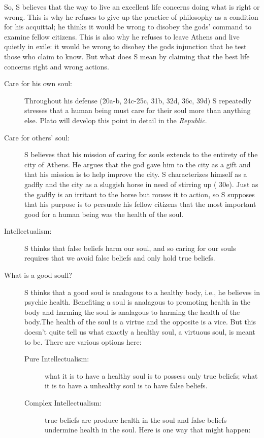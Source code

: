 \documentclass[oneside]{article}
\begin{document}
So, S believes that the way to live an excellent life concerns doing what is right or wrong. This is why he refuses to give up the practice of philosophy as a condition for his acquittal; he thinks it would be wrong to disobey the gods' command to examine  fellow citizens. This is also why he refuses to leave Athens and live quietly in exile: it would be wrong to disobey the gods injunction that he test those who claim to know. But what does S mean by claiming that the best life concerns right and wrong actions. 

\begin{description}
\item[Care for his own soul:] Throughout his defense (20a-b, 24c-25c, 31b, 32d, 36c, 39d) S repeatedly stresses that a human being must care for their soul more than anything else. Plato will develop this point in detail in the \emph{Republic}. 
\item[Care for others' soul:] S believes that his mission of caring for souls extends to the entirety of the city of Athens.  He argues that the god gave him to the city as a gift and that his mission is to help improve the city.  S characterizes himself as a gadfly and the city as a sluggish horse in need of stirring up ( 30e).  Just as the gadfly is an irritant to the horse but rouses it to action, so S supposes that his purpose is to persuade his fellow citizens that the most important good for a human being was the health of the soul.
\item[Intellectualism:] S thinks that false beliefs harm our soul, and so caring for our souls requires that we avoid false beliefs and only hold true beliefs. 
\item[What is a good soull?] S thinks that a good soul is analagous to a healthy body, i.e., he believes in psychic health. Benefiting a soul is analagous to promoting health in the body and harming the soul is analagous to harming the health of the body.The health of the soul is a virtue and the opposite is a vice. But this doesn't quite tell us what exactly a healthy soul, a virtuous soul, is meant to be. There are various options here: 
\begin{description}
\item[Pure Intellectualism:] what it is to have a healthy soul is to possess only true beliefs; what it is to have a unhealthy soul is to have false beliefs. 
\item[Complex Intellectualism:] true beliefs are produce health in the soul and false beliefs undermine health in the soul. Here is one way that might happen:

\end{description}
\end{description}
\end{document}
